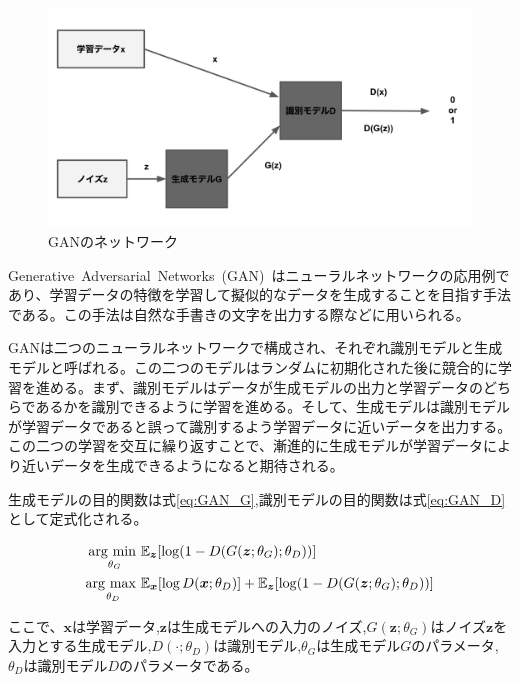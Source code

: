 \begin{figure}[t]
\begin{center}
\includegraphics[width=\hsize]{figure/GAN_net.png}
\caption{GANのネットワーク}
\label{fig:GAN_net}
\end{center}
\end{figure}


Generative~Adversarial~Networks~(GAN)~\cite{GAN}はニューラルネットワークの応用例であり、学習データの特徴を学習して擬似的なデータを生成することを目指す手法である。この手法は自然な手書きの文字を出力する際などに用いられる。

GANは二つのニューラルネットワークで構成され、それぞれ識別モデルと生成モデルと呼ばれる。この二つのモデルはランダムに初期化された後に競合的に学習を進める。まず、識別モデルはデータが生成モデルの出力と学習データのどちらであるかを識別できるように学習を進める。そして、生成モデルは識別モデルが学習データであると誤って識別するよう学習データに近いデータを出力する。この二つの学習を交互に繰り返すことで、漸進的に生成モデルが学習データにより近いデータを生成できるようになると期待される。

生成モデルの目的関数は式\ref{eq:GAN_G},識別モデルの目的関数は式\ref{eq:GAN_D}として定式化される。

\begin{align}
    \label{eq:GAN_G}
    \mathop{\rm arg~min~}\limits _{\theta_G}& \mathbb{E}_{\boldsymbol{z}}[\log (1-D(G(\boldsymbol{z};\theta_G);\theta_D))]\\
    \label{eq:GAN_D}
    \mathop{\rm arg~max~}\limits _{\theta_D}& \mathbb{E}_{\boldsymbol{x}}[\log D(\boldsymbol{x};\theta_D)]+\mathbb{E}_{\boldsymbol{z}}[\log (1-D(G(\boldsymbol{z};\theta_G);\theta_D))]
\end{align}


ここで、$\boldsymbol{x}$は学習データ,$\boldsymbol{z}$は生成モデルへの入力のノイズ,$G(\boldsymbol{z};\theta_G)$はノイズ$\boldsymbol{z}$を入力とする生成モデル,$D(\cdot;\theta_D)$は識別モデル,$\theta_G$は生成モデル$G$のパラメータ,$\theta_D$は識別モデル$D$のパラメータである。

